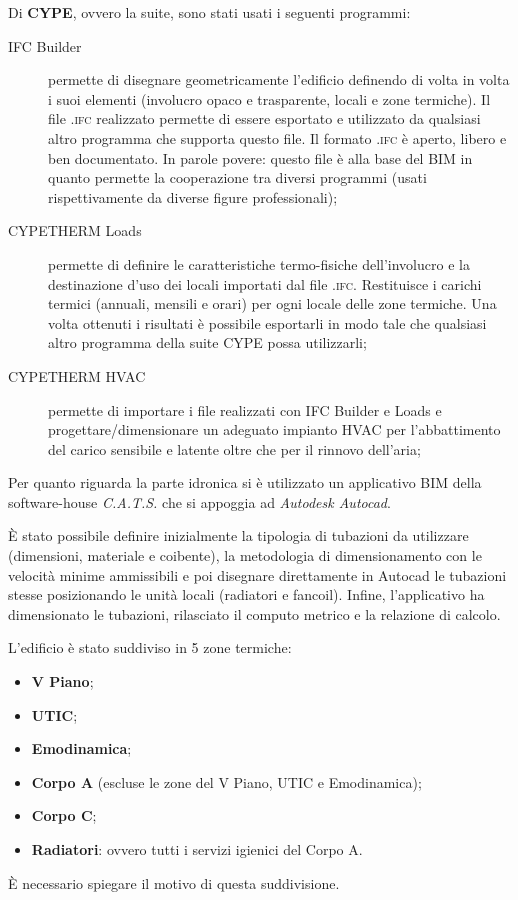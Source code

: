 Di \textbf{CYPE}, ovvero la suite, sono stati usati i seguenti programmi:
\begin{description}
	\item[IFC Builder]permette di disegnare geometricamente l'edificio definendo di volta in volta i suoi elementi (involucro opaco e trasparente, locali e zone termiche). Il file \textsc{.ifc} realizzato permette di essere esportato e utilizzato da qualsiasi altro programma che supporta questo file. Il formato \textsc{.ifc} è aperto, libero e ben documentato. In parole povere: questo file è alla base del BIM in quanto permette la cooperazione tra diversi programmi (usati rispettivamente da diverse figure professionali);
	\item[CYPETHERM Loads]permette di definire le caratteristiche termo-fisiche dell'involucro e la destinazione d'uso dei locali importati dal file \textsc{.ifc}. Restituisce i carichi termici (annuali, mensili e orari) per ogni locale delle zone termiche. Una volta ottenuti i risultati è possibile esportarli in modo tale che qualsiasi altro programma della suite CYPE possa utilizzarli;
	\item[CYPETHERM HVAC]permette di importare i file realizzati con IFC Builder e Loads e progettare/dimensionare un adeguato impianto HVAC per l'abbattimento del carico sensibile e latente oltre che per il rinnovo dell'aria;
\end{description}
Per quanto riguarda la parte idronica si è utilizzato un applicativo BIM della software-house \emph{C.A.T.S.} che si appoggia ad \emph{Autodesk Autocad}.

È stato possibile definire inizialmente la tipologia di tubazioni da utilizzare (dimensioni, materiale e coibente), la metodologia di dimensionamento con le velocità minime ammissibili e poi disegnare direttamente in Autocad le tubazioni stesse posizionando le unità locali (radiatori e fancoil). Infine, l'applicativo ha dimensionato le tubazioni, rilasciato il computo metrico e la relazione di calcolo.

L'edificio è stato suddiviso in 5 zone termiche:
\begin{itemize}
	\item \textbf{V Piano};
	\item \textbf{UTIC};
	\item \textbf{Emodinamica};
	\item \textbf{Corpo A} (escluse le zone del V Piano, UTIC e Emodinamica);
	\item \textbf{Corpo C};
	\item \textbf{Radiatori}: ovvero tutti i servizi igienici del Corpo A. 
\end{itemize}
È necessario spiegare il motivo di questa suddivisione.

